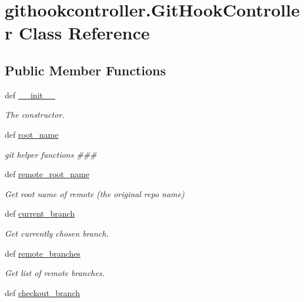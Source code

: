 \section{githookcontroller.\-Git\-Hook\-Controller Class Reference}
\label{classgithookcontroller_1_1GitHookController}
\subsection*{Public Member Functions}
\begin{DoxyCompactItemize}
\item 
def \hyperlink{classgithookcontroller_1_1GitHookController_a3f9a0075420262ba2568316c76061966}{\-\_\-\-\_\-init\-\_\-\-\_\-}
\begin{DoxyCompactList}\small\item\em The constructor. \end{DoxyCompactList}\item 
def \hyperlink{classgithookcontroller_1_1GitHookController_a584fe8bed0edc20058e18467a6e6906c}{root\-\_\-name}
\begin{DoxyCompactList}\small\item\em git helper functions \#\#\# \end{DoxyCompactList}\item 
def \hyperlink{classgithookcontroller_1_1GitHookController_a3324d38801396b1269a97890798103d5}{remote\-\_\-root\-\_\-name}
\begin{DoxyCompactList}\small\item\em Get root name of remote (the original repo name) \end{DoxyCompactList}\item 
def \hyperlink{classgithookcontroller_1_1GitHookController_a7a4041c01fb80bffb487936866f62f98}{current\-\_\-branch}
\begin{DoxyCompactList}\small\item\em Get currently chosen branch. \end{DoxyCompactList}\item 
def \hyperlink{classgithookcontroller_1_1GitHookController_a39661900fa09468fa6f1cb97ba859e80}{remote\-\_\-branches}
\begin{DoxyCompactList}\small\item\em Get list of remote branches. \end{DoxyCompactList}\item 
def \hyperlink{classgithookcontroller_1_1GitHookController_aba5b2ce717c869648bc8804c9ba96b3b}{checkout\-\_\-branch}

\end{DoxyCompactItemize}
